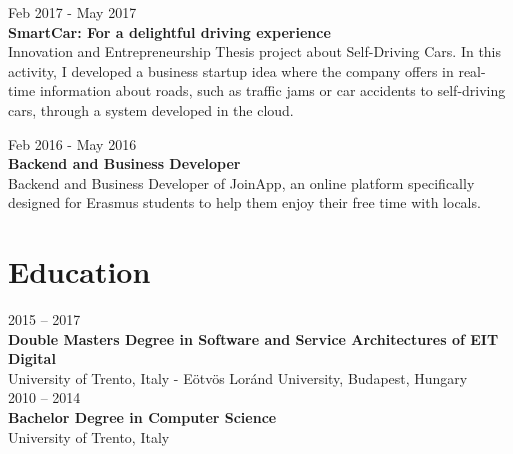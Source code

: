 \documentclass[]{friggeri-cv}
\begin{document}
{Feb 2017 - May 2017} \\
{\textbf{SmartCar: For a delightful driving experience}} \\
Innovation and Entrepreneurship Thesis project about Self-Driving Cars. In this activity, I developed a business startup idea where the company offers in real-time information about roads, such as traffic jams or car accidents to self-driving cars, through a system developed in the cloud.

{Feb 2016 - May 2016} \\
{\textbf{Backend and Business Developer}} \\
Backend and Business Developer of JoinApp, an online platform specifically designed for Erasmus students to help them enjoy their free time with locals.


\section{Education}

{2015 -- 2017} \\
\textbf{Double Masters Degree {\normalfont in Software and Service Architectures of EIT Digital}} \\
{University of Trento, Italy - Eötvös Loránd University, Budapest, Hungary} \\

{2010 -- 2014} \\
\textbf{Bachelor Degree {\normalfont in Computer Science}} \\
{University of Trento, Italy}
\end{document}
